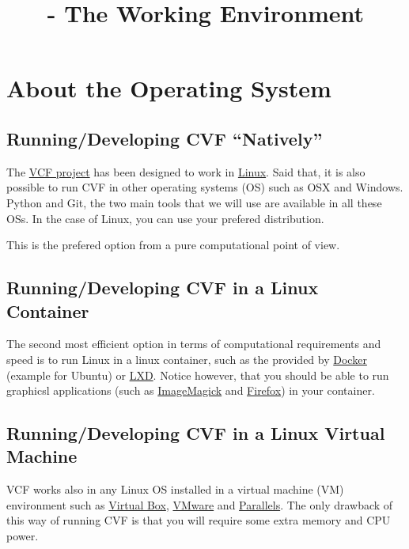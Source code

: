 
\title{\SM{} - The Working Environment}

\maketitle

\tableofcontents

\section{About the Operating System}

\subsection{Running/Developing CVF ``Natively''}
The \href{https://github.com/Sistemas-Multimedia/VCF}{VCF project} has
been designed to work
in \href{https://en.wikipedia.org/wiki/Linux}{Linux}. Said that, it is
also possible to run CVF in other operating systems (OS) such as OSX
and Windows. Python and Git, the two main tools that we will use are
available in all these OSs. In the case of Linux, you can use your
prefered distribution.

This is the prefered option from a pure computational point of view.

\subsection{Running/Developing CVF in a Linux Container}
The second most efficient option in terms of computational
requirements and speed is to run Linux in a linux container, such
as the provided by \href{https://linuxcontainers.org/}{Docker}
(example for Ubuntu)
or \href{https://linuxcontainers.org/}{LXD}. Notice however, that you
should be able to run graphicsl applications (such
as \href{https://linuxcontainers.org/}{ImageMagick}
and \href{https://www.mozilla.org/firefox}{Firefox}) in your
container.

\subsection{Running/Developing CVF in a Linux Virtual Machine}
VCF works also in any Linux OS installed in a virtual machine (VM)
environment such as \href{https://www.virtualbox.org/}{Virtual Box},
\href{https://www.vmware.com/}{VMware} and \href{https://www.vmware.com/}{Parallels}.
The only drawback of this way of running CVF is that you will require
some extra memory and CPU power.

